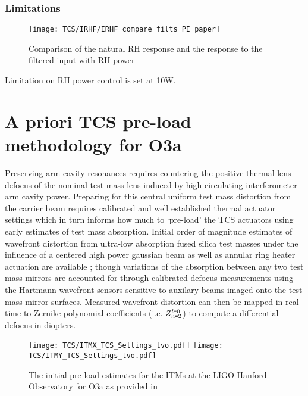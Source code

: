 \subsubsection{Limitations}
    \begin{figure}[H]
    \texttt{[image: TCS/IRHF/IRHF\_compare\_filts\_PI\_paper]}
    \caption{Comparison of the natural RH response and the response to the filtered input with RH power}
    \label{fig:RH_power}
\end{figure}
Limitation on RH power control is set at 10W. \cite{dcc:rhspec}

\section{A priori TCS pre-load methodology for O3a}
Preserving arm cavity resonances requires countering the positive thermal lens defocus of the nominal test mass lens induced by high circulating interferometer arm cavity power. Preparing for this central uniform test mass distortion from the carrier beam requires calibrated and well established thermal actuator settings which in turn informs how much to `pre-load' the TCS actuators using early estimates of test mass absorption. Initial order of magnitude estimates of wavefront distortion from ultra-low absorption fused silica test masses under the influence of a centered high power gaussian beam as well as annular ring heater actuation are available \cite{hellovinet:1990, ramette:2016}; though variations of the absorption between any two test mass mirrors are accounted for through calibrated defocus measurements using the Hartmann wavefront sensors sensitive to auxilary beams imaged onto the test mass mirror surfaces. Measured wavefront distortion can then be mapped in real time to Zernike polynomial coefficients (i.e. $Z^{l \texttt{=} 0}_{n \texttt{=} 2}$) to compute a differential defocus in diopters.

\begin{figure}[H]
  \centering
  \begin{subcaptiongroup}
	  \texttt{[image: TCS/ITMX\_TCS\_Settings\_tvo.pdf]}
	  \label{ITMX_TCS}
	  \texttt{[image: TCS/ITMY\_TCS\_Settings\_tvo.pdf]}
	  \label{ITMY_TCS}
  \end{subcaptiongroup}
  \captionsetup{subrefformat=parens}
  \hfill
  \caption{The initial pre-load estimates for the ITMs at the LIGO Hanford Observatory for O3a as provided in \cite{tvo}} 
  \label{fig:O3_preload_tvo}
\end{figure}

